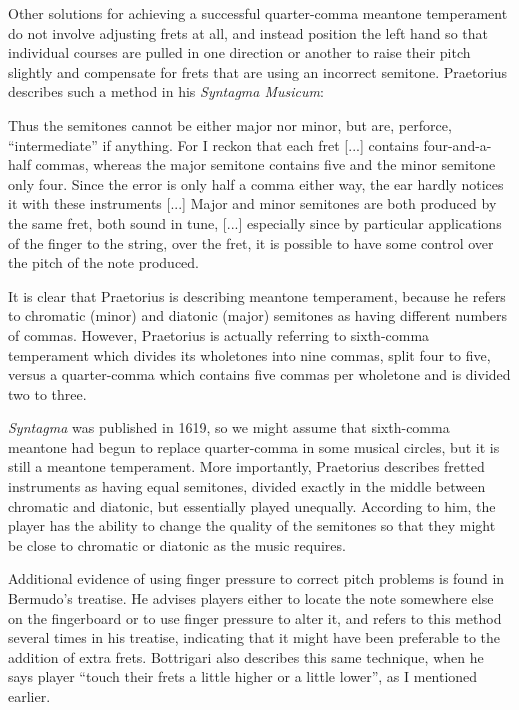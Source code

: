 Other solutions for achieving a successful quarter-comma meantone temperament do not involve
adjusting frets at all, and instead position the left hand so that individual courses are pulled in
one direction or another to raise their pitch slightly and compensate for frets that are using an
incorrect semitone. Praetorius describes such a method in his \textit{Syntagma Musicum}:
\begin{blocks}
Thus the semitones cannot be either major nor minor, but are, perforce, ``intermediate''
if anything. For I reckon that each fret [...] contains four-and-a-half commas, whereas
the major semitone contains five and the minor semitone only four. Since the error is
only half a comma either way, the ear hardly notices it with these instruments [...]
Major and minor semitones are both produced by the same fret, both sound in tune, [...]
especially since by particular applications of the finger to the string, over the fret,
it is possible to have some control over the pitch of the note produced.
\autocite[68]{MP:1}
\end{blocks}
It is clear that Praetorius is describing meantone temperament, because he
refers to chromatic (minor) and diatonic (major) semitones as having different numbers of
commas.  However, Praetorius is actually referring to sixth-comma temperament
which divides its wholetones into nine commas, split four to five, versus a quarter-comma
which contains five commas per wholetone and is divided two to three.

\textit{Syntagma} was published in 1619, so we might assume that sixth-comma
meantone had begun to replace quarter-comma in some musical circles, but it is still a
meantone temperament.  More importantly, Praetorius describes fretted instruments as
having equal semitones, divided exactly in the middle between chromatic and diatonic,
but essentially played unequally.  According to him, the player has the ability to
change the quality of the semitones so that they might be close to chromatic or
diatonic as the music requires.

Additional evidence of using finger pressure to correct pitch problems is found
in Bermudo's treatise. He advises players either to locate the note somewhere
else on the fingerboard or to use finger pressure to alter it, and refers to
this method several times in his treatise, indicating that it might have been
preferable to the addition of extra frets. \autocite[106]{DE:1}  Bottrigari also
describes this same technique, when he says player ``touch their frets a little
higher or a little lower'', as I mentioned earlier. \autocite[15]{HB:1}

